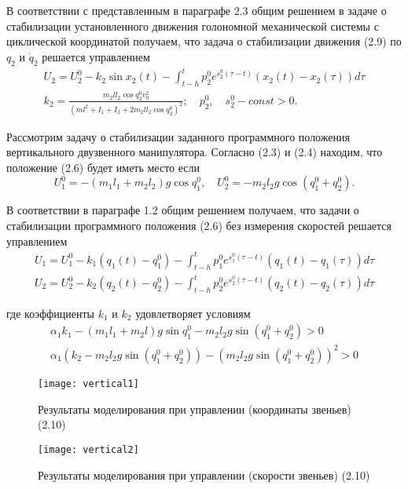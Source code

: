 В соответствии с представленным в параграфе 2.3 общим решением в задаче о стабилизации установленного движения голономной механической системы с циклической координатой получаем, что задача о стабилизации движения (2.9) по $q_2$ и $\dot q_2$ решается управлением
$$
\begin{array}{c}
\displaystyle U_2 = U_2^0 - k_2 \sin x_2 (t) - \int_{t-h}^{t} p_2^0 e^{s_2^0 (\tau - t)} (x_2 (t) - x_2 (\tau)) d \tau\\
\displaystyle k_2 = \frac{m_2 l l_2 \cos q_2^0 v_0^2}{(m l^2 + I_1 + I_2 + 2 m_2 l l_2 \cos q_2^0)^2}; \quad p_2^0, \quad s_2^0 - const > 0.
\end{array}
$$

Рассмотрим задачу о стабилизации заданного программного положения вертикального двузвенного манипулятора. Согласно (2.3) и (2.4) находим, что положение (2.6) будет иметь место если $$U_1^0 = -(m_1 l_1 + m_2 l_2) g \cos q_1^0, \quad U_2^0 = -m_2 l_2 g \cos (q_1^0 + q_2^0).$$

В соответствии в параграфе 1.2 общим решением получаем, что задачи о стабилизации программного положения (2.6) без измерения скоростей решается управлением 
\begin{equation}
\begin{array}{l}
\displaystyle U_1 = U_1^0 - k_1 (q_1(t) - q_1^0) - \int_{t-h}^{t} p_1^0 e^{s_1^0 (\tau - t)} (q_1(t) - q_1(\tau)) d \tau\\
\displaystyle U_2 = U_2^0 - k_2 (q_2(t) - q_2^0) - \int_{t-h}^{t} p_2^0 e^{s_2^0 (\tau - t)} (q_2(t) - q_2(\tau)) d \tau
\end{array}
\end{equation}

где коэффициенты $k_1$ и $k_2$ удовлетворяет условиям 
$$
\begin{array}{c}
\alpha_1 k_1 - (m_1 l_1 + m_2 l) g \sin q_1^0 - m_2 l_2 g \sin (q_1^0 + q_2^0) > 0\\
\alpha_1 (k_2 - m_2 l_2 g \sin (q_1^0 + q_2^0)) - (m_2 l_2 g \sin (q_1^0 + q_2^0))^2 > 0
\end{array}
$$

\begin{figure}[h]
	\centering
	\texttt{[image: vertical1]}
	\caption{Результаты моделирования при управлении (координаты звеньев) (2.10)}
	\label{fig:manip_horizontal}
\end{figure}

\begin{figure}[h]
	\centering
	\texttt{[image: vertical2]}
	\caption{Результаты моделирования при управлении (скорости звеньев) (2.10)}
	\label{fig:manip_vertical}
\end{figure}